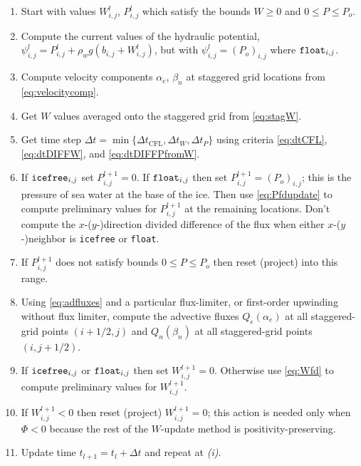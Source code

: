 \documentclass[11pt,final]{amsart}%
\newcommand{\Wlij}{W^l_{i,j}}
\newcommand{\Plij}{P^l_{i,j}}
\begin{document}
\bigskip\medskip
\renewcommand{\labelenumi}{\emph{(\roman{enumi})}}
\begin{enumerate}
\item Start with values $\Wlij$, $\Plij$ which satisfy the bounds $W\ge 0$ and $0 \le P \le P_o$.
\item Compute the current values of the hydraulic potential, $\psi_{i,j}^l = \Plij + \rho_w g(b_{i,j} + \Wlij)$, but with $\psi_{i,j}^l=(P_o)_{i,j}$ where $\text{\texttt{float}}_{i,j}$.
\item Compute velocity components $\alpha_e$, $\beta_n$ at staggered grid locations from \eqref{eq:velocitycomp}.
\item Get $W$ values averaged onto the staggered grid from \eqref{eq:stagW}.
\item Get time step $\Delta t = \min\{\Delta t_{\text{CFL}}, \Delta t_W, \Delta t_P\}$ using criteria \eqref{eq:dtCFL}, \eqref{eq:dtDIFFW}, and \eqref{eq:dtDIFFPfromW}.
\item If $\text{\texttt{icefree}}_{i,j}$ set $P_{i,j}^{l+1}=0$.  If $\text{\texttt{float}}_{i,j}$ then set $P_{i,j}^{l+1} = (P_o)_{i,j}$; this is the pressure of sea water at the base of the ice.  Then use \eqref{eq:Pfdupdate} to compute preliminary values for $P_{i,j}^{l+1}$ at the remaining locations.  Don't compute the $x$-($y$-)direction divided difference of the flux when either $x$-($y$-)neighbor is \texttt{icefree} or \texttt{float}.
\item If $P_{i,j}^{l+1}$ does not satisfy bounds $0 \le P \le P_o$ then reset (project) into this range.
\item Using \eqref{eq:adfluxes} and a particular flux-limiter, or first-order upwinding without flux limiter, compute the advective fluxes $Q_e(\alpha_e)$ at all staggered-grid points $(i+1/2,j)$ and $Q_n(\beta_n)$ at all staggered-grid points $(i,j+1/2)$.  
\item If $\text{\texttt{icefree}}_{i,j}$ or $\text{\texttt{float}}_{i,j}$ then set $W_{i,j}^{l+1}=0$.  Otherwise use \eqref{eq:Wfd} to compute preliminary values for $W_{i,j}^{l+1}$.
\item If $W_{i,j}^{l+1}<0$ then reset (project) $W_{i,j}^{l+1}=0$; this action is needed only when $\Phi<0$ because the rest of the $W$-update method is positivity-preserving.
\item Update time $t_{l+1}=t_l+\Delta t$ and repeat at \emph{(i)}.
\end{enumerate}
\end{document}
